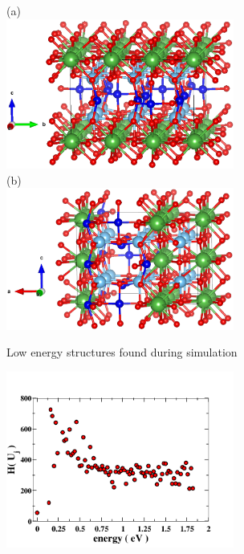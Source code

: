 \documentclass[aps,prl,reprint,superscriptaddress,showkeys]{revtex4-1}
\begin{document}
\begin{figure}
(a)\\
\includegraphics[width=7.5cm]{./figures/it326_run6_lowest_en.eps}\\
(b)\\
\includegraphics[width=7.5cm]{./figures/it1575_run1_second_lowest_en.eps}
\caption{Low energy structures found during simulation\label{lowen_structures}}
\end{figure}

\begin{figure}
\includegraphics[width=7.5cm]{./figures/Htot.png}
\caption{\label{Htot}}
\end{figure}
\end{document}
